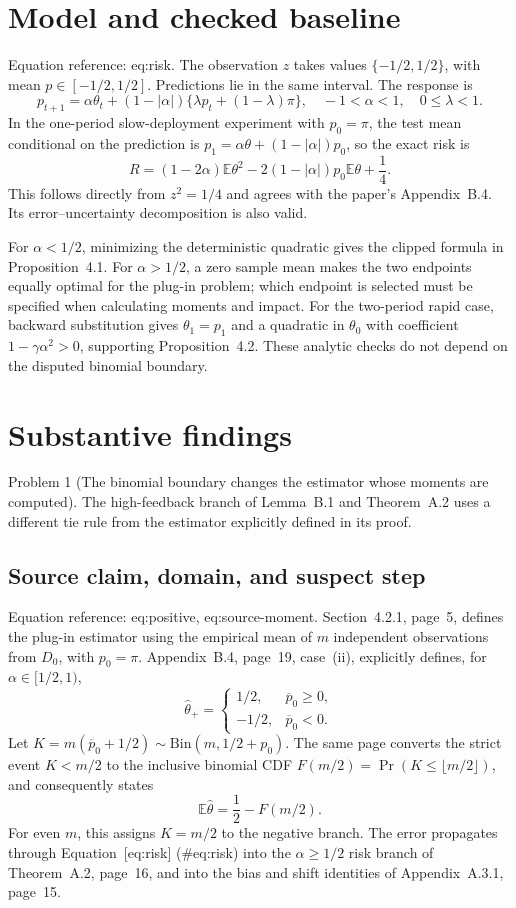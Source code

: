 \documentclass[10pt]{article}
\begin{document}
\section*{Model and checked baseline}
Equation reference: eq:risk. The observation \(z\) takes values \(\{-1/2,1/2\}\), with mean \(p\in[-1/2,1/2]\). Predictions lie in the same interval. The response is \[p_{t+1}=\alpha\theta_t+(1-|\alpha|)
 \{\lambda p_t+(1-\lambda)\pi\},
 \quad -1<\alpha<1,\quad 0\leq\lambda<1.\] In the one-period slow-deployment experiment with \(p_0=\pi\), the test mean conditional on the prediction is \(p_1=\alpha\theta+(1-|\alpha|)p_0\), so the exact risk is \[
 R=(1-2\alpha)\mathbb E\theta^2
   -2(1-|\alpha|)p_0\mathbb E\theta+\frac14.\] This follows directly from \(z^2=1/4\) and agrees with the paper’s Appendix B.4. Its error–uncertainty decomposition is also valid.\par
For \(\alpha<1/2\), minimizing the deterministic quadratic gives the clipped formula in Proposition 4.1. For \(\alpha>1/2\), a zero sample mean makes the two endpoints equally optimal for the plug-in problem; which endpoint is selected must be specified when calculating moments and impact. For the two-period rapid case, backward substitution gives \(\theta_1=p_1\) and a quadratic in \(\theta_0\) with coefficient \(1-\gamma\alpha^2>0\), supporting Proposition 4.2. These analytic checks do not depend on the disputed binomial boundary.\par
\section*{Substantive findings}
Problem 1 (The binomial boundary changes the estimator whose moments are computed).  The high-feedback branch of Lemma B.1 and Theorem A.2 uses a different tie rule from the estimator explicitly defined in its proof.\par
\subsection*{Source claim, domain, and suspect step}
Equation reference: eq:positive, eq:source-moment. Section 4.2.1, page 5, defines the plug-in estimator using the empirical mean of \(m\) independent observations from \(D_0\), with \(p_0=\pi\). Appendix B.4, page 19, case (ii), explicitly defines, for \(\alpha\in[1/2,1)\), \[
 \widehat\theta_+=
 \begin{cases}
  1/2,&\overline p_0\geq0,\\
  -1/2,&\overline p_0<0.
 \end{cases}\] Let \(K=m(\overline p_0+1/2)\sim\mathrm{Bin}(m,1/2+p_0)\). The same page converts the strict event \(K<m/2\) to the inclusive binomial CDF \(F(m/2)=\Pr(K\leq\lfloor m/2\rfloor)\), and consequently states \[
 \mathbb E\widehat\theta=\frac12-F(m/2).\] For even \(m\), this assigns \(K=m/2\) to the negative branch. The error propagates through Equation [eq:risk] (\#eq:risk) into the \(\alpha\geq1/2\) risk branch of Theorem A.2, page 16, and into the bias and shift identities of Appendix A.3.1, page 15.\par
\end{document}
